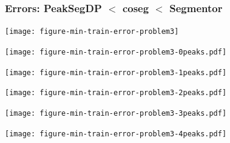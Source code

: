 \documentclass{beamer}
\begin{document}
\begin{frame}
  \frametitle{Errors: PeakSegDP $<$ coseg $<$ Segmentor}
  \texttt{[image: figure-min-train-error-problem3]}
\end{frame}

\begin{frame}
  \texttt{[image: figure-min-train-error-problem3-0peaks.pdf]}
\end{frame}

\begin{frame}
  \texttt{[image: figure-min-train-error-problem3-1peaks.pdf]}
\end{frame}

\begin{frame}
  \texttt{[image: figure-min-train-error-problem3-2peaks.pdf]}
\end{frame}

\begin{frame}
  \texttt{[image: figure-min-train-error-problem3-3peaks.pdf]}
\end{frame}

\begin{frame}
  \texttt{[image: figure-min-train-error-problem3-4peaks.pdf]}
\end{frame}
\end{document}
